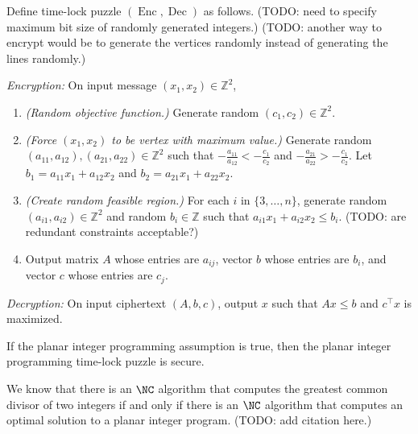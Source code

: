 \documentclass{article}
\newcommand{\Enc}{\operatorname{Enc}}
\newcommand{\Dec}{\operatorname{Dec}}
\begin{document}
\begin{protocol}
  Define time-lock puzzle $(\Enc, \Dec)$ as follows.
  (TODO: need to specify maximum bit size of randomly generated integers.)
  (TODO: another way to encrypt would be to generate the vertices randomly instead of generating the lines randomly.)

  \emph{Encryption:} On input message $(x_1, x_2) \in \mathbb{Z}^2$,
  \begin{enumerate}
  \item \emph{(Random objective function.)}
    Generate random $(c_1, c_2) \in \mathbb{Z}^2$.
  \item \emph{(Force $(x_1, x_2)$ to be vertex with maximum value.)}
    Generate random $(a_{11}, a_{12}), (a_{21}, a_{22}) \in \mathbb{Z}^2$ such that $-\frac{a_{11}}{a_{12}} < -\frac{c_1}{c_2}$ and $-\frac{a_{21}}{a_{22}} > -\frac{c_1}{c_2}$.
    Let $b_1 = a_{11} x_1 + a_{12} x_2$ and $b_2 = a_{21} x_1 + a_{22} x_2$.
  \item \emph{(Create random feasible region.)}
    For each $i$ in $\{3, \dotsc, n\}$, generate random $(a_{i1}, a_{i2}) \in \mathbb{Z}^2$ and random $b_i \in \mathbb{Z}$ such that $a_{i1} x_1 + a_{i2} x_2 \leq b_i$.
    (TODO: are redundant constraints acceptable?)
  \item Output matrix $A$ whose entries are $a_{ij}$, vector $b$ whose entries are $b_i$, and vector $c$ whose entries are $c_j$.
  \end{enumerate}

  \emph{Decryption:} On input ciphertext $(A, b, c)$, output $x$ such that $Ax \leq b$ and $c^\intercal x$ is maximized.
\end{protocol}

\begin{conjecture}
  If the planar integer programming assumption is true, then the planar integer programming time-lock puzzle is secure.
\end{conjecture}

We know that there is an $\NC$ algorithm that computes the greatest common divisor of two integers if and only if there is an $\NC$ algorithm that computes an optimal solution to a planar integer program.
(TODO: add citation here.)
\end{document}
